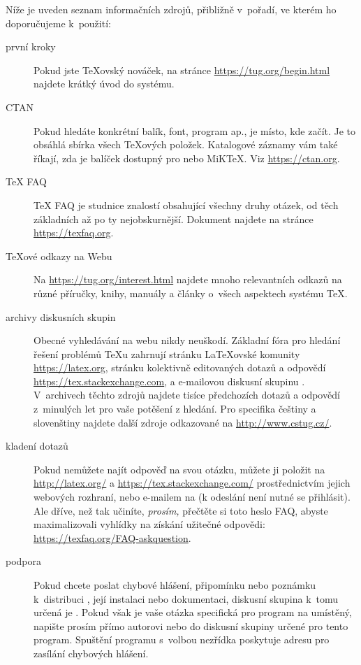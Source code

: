 \documentclass[\classoptions,slovak,english,czech]{\classname}
\begin{document}
Níže je uveden seznam informačních zdrojů, přibližně v~pořadí, ve kterém
ho doporučujeme k~použití:
\begin{description}
\item [první kroky] Pokud jste \TeX ovský nováček, na stránce
\url{https://tug.org/begin.html} najdete krátký úvod do systému.

\item [CTAN] Pokud hledáte konkrétní balík,
  font, program ap., \CTAN{} je místo, kde začít.
  Je to obsáhlá sbírka všech \TeX{}ových položek. Katalogové záznamy vám také říkají, zda je
  balíček dostupný pro \TL{} nebo MiK\TeX. Viz
  \url{https://ctan.org}.

\item [\TeX{} FAQ] \TeX{} FAQ je studnice
znalostí obsahující všechny druhy otázek, od těch základních až po 
ty nejobskurnější. Dokument najdete na stránce  \url{https://texfaq.org}.

\item [\TeX{}ové odkazy na Webu] Na \url{https://tug.org/interest.html}
  najdete mnoho relevantních odkazů na různé příručky,
  knihy, manuály a články o~všech aspektech systému \TeX{}.

\item [archivy diskusních skupin]
Obecné vyhledávání na webu nikdy neuškodí.
Základní fóra pro hledání řešení problémů \TeX{}u zahrnují 
stránku \LaTeX{}ovské komunity \url{https://latex.org}, 
stránku kolektivně editovaných dotazů a odpovědí \url{https://tex.stackexchange.com},
a e-mailovou diskusní skupinu . 
V~archivech těchto zdrojů najdete tisíce předchozích dotazů 
a odpovědí z~minulých let pro vaše potěšení z hledání.
Pro specifika češtiny a slovenštiny najdete další zdroje
odkazované na \url{http://www.cstug.cz/}.
  
\item [kladení dotazů] Pokud nemůžete najít odpověď na svou otázku,
můžete ji položit na \url{http://latex.org/} a
\url{https://tex.stackexchange.com/} prostřednictvím jejich webových rozhraní, 
nebo e-mailem na  (k odeslání není nutné se přihlásit).
Ale dříve, než tak učiníte, \emph{prosím,} přečtěte si toto heslo FAQ,
abyste maximalizovali vyhlídky na získání užitečné odpovědi:
\url{https://texfaq.org/FAQ-askquestion}.

\item [podpora \TL{}] Pokud chcete poslat
  chybové hlášení, připomínku nebo poznámku k~distribuci
  \TL{}, její instalaci nebo dokumentaci,
  diskusní skupina k~tomu určená je .
  Pokud však je vaše otázka specifická pro program na
  \TL{} umístěný, napište prosím přímo autorovi nebo do diskusní
  skupiny určené pro tento program. Spuštění programu 
  s~volbou  nezřídka
  poskytuje adresu pro zasílání chybových hlášení.
\end{description}
\end{document}

